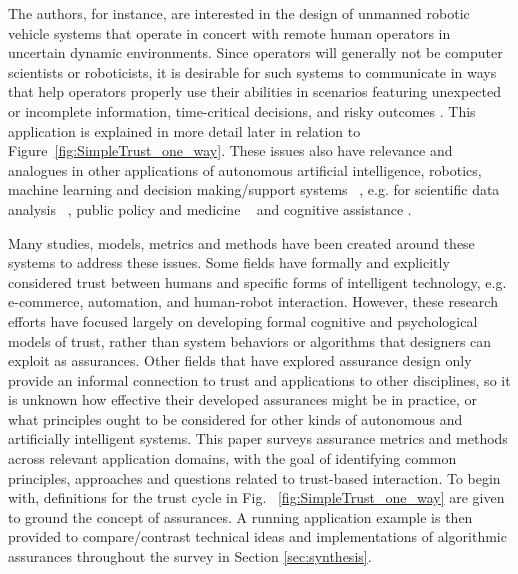     The authors, for instance, are interested in the design of unmanned robotic vehicle systems that operate in concert with remote human operators in uncertain dynamic environments. 
    Since operators will generally not be computer scientists or roboticists, it is desirable for such systems to communicate in ways that help operators properly use their abilities in scenarios featuring unexpected or incomplete information, time-critical decisions, and risky outcomes \cite{Hutchins2015-if, Sweet2016-tz}. 
    This application is explained in more detail later in relation to Figure~\ref{fig:SimpleTrust_one_way}. 
    These issues also have relevance and analogues in other applications of autonomous artificial intelligence, robotics, machine learning and decision making/support systems ~\cite{Garcia2015-rs,Otte2013-oo,Sugiyama2013-ci,Amodei2016-xi}, e.g. for scientific data analysis ~\cite{Faghmous2014-og}, public policy and medicine ~\cite{Wagner2016-ck,Jovanovic2016-gw} and cognitive assistance \cite{Gutfreund2016-xe}.
    
    Many studies, models, metrics and methods have been created around these systems to address these issues. 
    Some fields have formally and explicitly considered trust between humans and specific forms of intelligent technology, e.g. e-commerce, automation, and human-robot interaction. However, these research efforts have focused largely on developing formal cognitive and psychological models of trust, rather than system behaviors or algorithms that designers can exploit as assurances. %
    Other fields that have explored assurance design only provide an informal connection to trust and applications to other disciplines, so it is unknown how effective their developed assurances might be in practice, or what principles ought to be considered for other kinds of autonomous and artificially intelligent systems. 
    This paper surveys assurance metrics and methods across relevant application domains, with the goal of %
    identifying common principles, approaches and questions related to trust-based interaction. %
    To begin with, definitions for the trust cycle in Fig. ~\ref{fig:SimpleTrust_one_way} are given to ground the concept of assurances. A running application example is then provided to compare/contrast technical ideas and implementations of algorithmic assurances throughout the survey in Section \ref{sec:synthesis}. 
     
